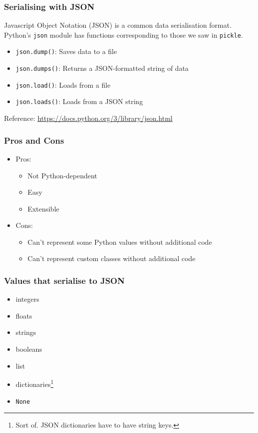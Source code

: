 \documentclass[10pt]{beamer}
\begin{document}
\begin{frame}
  \frametitle{Serialising with JSON}
  
  Javascript Object Notation (JSON) is a common data serialisation format.
  Python's \texttt{json} module has functions corresponding to those we saw in 
  \texttt{pickle}.
  
  \begin{itemize}
    \item \texttt{json.dump()}: Saves data to a file
    \item \texttt{json.dumps()}: Returns a JSON-formatted string of data
    \item \texttt{json.load()}: Loads from a file
    \item \texttt{json.loads()}: Loads from a JSON string
  \end{itemize}

   Reference: \url{https://docs.python.org/3/library/json.html}

  
\end{frame}
 \begin{frame}
  \frametitle{Pros and Cons}
  
  \begin{itemize}
    \item Pros:
      \begin{itemize}
        \item Not Python-dependent
        \item Easy
        \item Extensible
      \end{itemize}  
    \item Cons:
      \begin{itemize}
        \item Can't represent some Python values without additional code
        \item Can't represent custom classes without additional code
      \end{itemize}  
  \end{itemize}
\end{frame}
\begin{frame}
  \frametitle{Values that serialise to JSON}
  
  \begin{itemize}
    \item integers
    \item floats
    \item strings
    \item booleans
    \item list
    \item dictionaries\footnote{Sort of. JSON dictionaries have to have string keys.}
    \item \texttt{None}
   \end{itemize}
\end{frame} 
\end{document}
